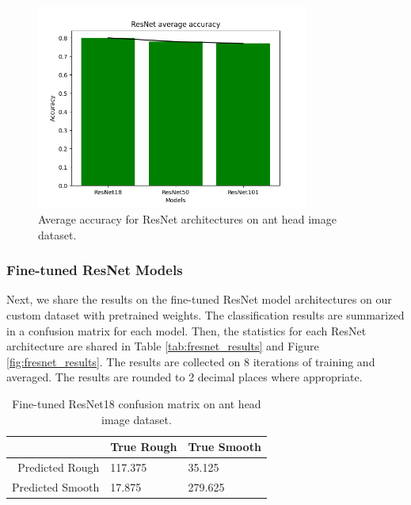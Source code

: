 \documentclass[12pt]{article}
\begin{document}
\begin{figure}[h]
    \centering
    \includegraphics[width=0.8\textwidth]{assets/plots/resnet_average.png}
    \caption{Average accuracy for ResNet architectures on ant head image dataset.}
    \label{fig:resnet_results}
\end{figure}

\clearpage
\subsubsection{Fine-tuned ResNet Models}

Next, we share the results on the fine-tuned ResNet model architectures on our
custom dataset with pretrained weights. The classification results are
summarized in a confusion matrix for each model. Then, the statistics for each
ResNet architecture are shared in Table \ref{tab:fresnet_results} and Figure
\ref{fig:fresnet_results}. The results are collected on 8 iterations of training
and averaged. The results are rounded to 2 decimal places where appropriate.

\vspace{0.5in}

\begin{table}[h]
    \centering
    \caption{Fine-tuned ResNet18 confusion matrix on ant head image dataset.}
    \begin{tabular}{r|ll}
                         & True Rough & True Smooth \\
        \hline
        Predicted Rough  & 117.375    & 35.125      \\
        Predicted Smooth & 17.875     & 279.625     \\
    \end{tabular}
    \label{tab:fresnet18_confusion_matrix}
\end{table}
\end{document}
